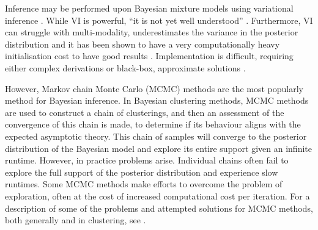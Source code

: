 \documentclass{bioinfo}
\begin{document}


Inference may be performed upon Bayesian mixture models using variational inference \citep[\textbf{VI},][]{blei2006variational}.
While VI is powerful, ``it is not yet well understood'' \citep{blei2017variational}. Furthermore, VI can struggle with multi-modality, underestimates the variance in the posterior distribution \citep{two2011turner} and it has been shown to have a very computationally heavy initialisation cost to have good results \citep{wang2011fast}. Implementation is difficult, requiring either complex derivations \citep[see the Appendix Supplementary Methods of][for an example]{argelaguet2018multi} or black-box, approximate solutions \citep{kucukelbir2017automatic}.

However, Markov chain Monte Carlo (MCMC) methods are the most popularly method for Bayesian inference. In Bayesian clustering methods, MCMC methods are used to construct a chain of clusterings, and then an assessment of the convergence of this chain is made, to determine if its behaviour aligns with the expected asymptotic theory. This chain of samples will converge to the posterior distribution of the Bayesian model and explore its entire support given an infinite runtime. However, in practice problems arise. Individual chains often fail to explore the full support of the posterior distribution \citep[an example of different chains becoming trapped in a single mode of the likelihood surface can be seen in the Supplementary Materials of ][]{strauss2020gpseudoclust} and experience slow runtimes. Some MCMC methods make efforts to overcome the problem of exploration, often at the cost of increased computational cost per iteration. For a description of some of the problems and attempted solutions for MCMC methods, both generally and in clustering, see \cite{robert2018accelerating, yao2020stacking, chandra2020bayesian}. 
\end{document}
